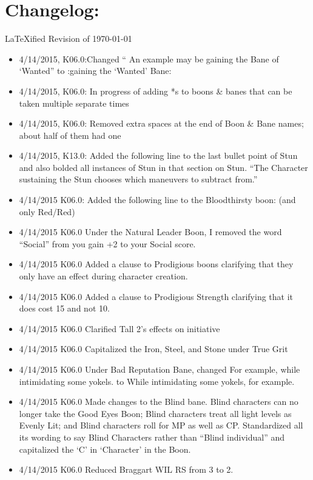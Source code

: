 \documentclass[oneside,11pt,english]{book}
\begin{document}
\frontmatter
\section*{Changelog:}
{\huge\LaTeX ified Revision of \today}
{\footnotesize
	\begin{itemize}
	\setlength\itemsep{0mm}
\item 4/14/2015, K06.0:Changed “ An example may be gaining the Bane of ‘Wanted” to :gaining the ‘Wanted’ 
Bane: 
\item 4/14/2015, K06.0: In progress of adding *s to boons \& banes that can be taken multiple separate times 
\item 4/14/2015, K06.0: Removed extra spaces at the end of Boon \& Bane names; about half of them had one 
\item 4/14/2015, K13.0: Added the following line to the last bullet point of Stun and also bolded all instances of 
Stun in that section on Stun. “The Character sustaining the Stun chooses which maneuvers to subtract 
from.” 
\item 4/14/2015 K06.0: Added the following line to the Bloodthirsty boon: (and only Red/Red)
\item 4/14/2015 K06.0 Under the Natural Leader Boon, I removed the word “Social” from you gain +2 to your 
Social score. 
\item 4/14/2015 K06.0 Added a clause to Prodigious boons clarifying that they only have an effect during 
character creation. 
\item 4/14/2015 K06.0 Added a clause to Prodigious Strength clarifying that it does cost 15 and not 10. 
\item 4/14/2015 K06.0 Clarified Tall 2’s effects on initiative 
\item 4/14/2015 K06.0 Capitalized the Iron, Steel, and Stone under True Grit 
\item 4/14/2015 K06.0 Under Bad Reputation Bane, changed For example, while intimidating some yokels. to 
While intimidating some yokels, for example. 
\item 4/14/2015 K06.0 Made changes to the Blind bane. Blind characters can no longer take the Good Eyes 
Boon; Blind characters treat all light levels as Evenly Lit; and Blind characters roll for MP as well as CP. 
Standardized all its wording to say Blind Characters rather than “Blind individual” and capitalized the ‘C’ in 
‘Character’ in the Boon. 
\item 4/14/2015 K06.0 Reduced Braggart WIL RS from 3 to 2. 

\end{itemize}}
\end{document}

